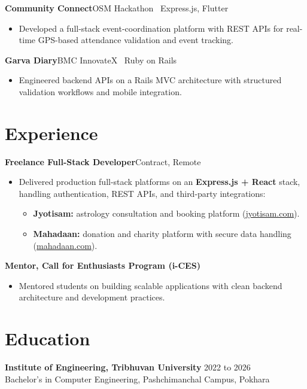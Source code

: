\documentclass[a4paper,10pt]{article}
\newcommand{\project}[2]{\textbf{#1}\hfill{\color{rulegray}\small #2}\par\vspace{1pt}}
\begin{document}
\project{Community Connect}{OSM Hackathon \textbar\ Express.js, Flutter}
\begin{itemize}
\item Developed a full-stack event-coordination platform with REST APIs for real-time GPS-based attendance validation and event tracking.
\end{itemize}

\project{Garva Diary}{BMC InnovateX \textbar\ Ruby on Rails}
\begin{itemize}
\item Engineered backend APIs on a Rails MVC architecture with structured validation workflows and mobile integration.
\end{itemize}

\section*{Experience}

\project{Freelance Full-Stack Developer}{Contract, Remote}
\begin{itemize}
\item Delivered production full-stack platforms on an \textbf{Express.js + React} stack, handling authentication, REST APIs, and third-party integrations:
\begin{itemize}
\item \textbf{Jyotisam:} astrology consultation and booking platform (\href{https://jyotisam.com}{jyotisam.com}).
\item \textbf{Mahadaan:} donation and charity platform with secure data handling (\href{https://mahadaan.com}{mahadaan.com}).
\end{itemize}
\end{itemize}

\project{Mentor, Call for Enthusiasts Program (i-CES)}{}
\begin{itemize}
\item Mentored students on building scalable applications with clean backend architecture and development practices.
\end{itemize}

\section*{Education}

\textbf{Institute of Engineering, Tribhuvan University} \hfill 2022 to 2026\\
Bachelor's in Computer Engineering, Pashchimanchal Campus, Pokhara \hfill
\end{document}

